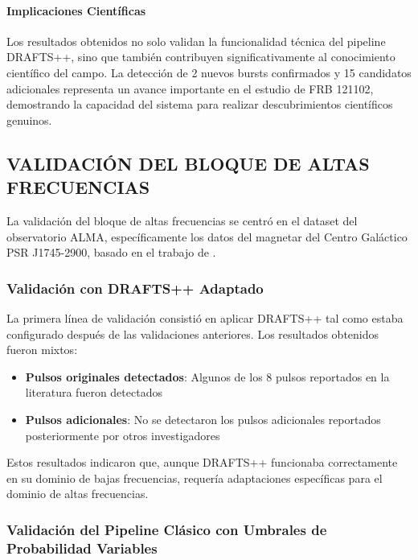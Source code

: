 \paragraph{Implicaciones Científicas}

Los resultados obtenidos no solo validan la funcionalidad técnica del pipeline DRAFTS++, sino que también contribuyen significativamente al conocimiento científico del campo. La detección de 2 nuevos bursts confirmados y 15 candidatos adicionales representa un avance importante en el estudio de FRB 121102, demostrando la capacidad del sistema para realizar descubrimientos científicos genuinos.

\subsection{VALIDACIÓN DEL BLOQUE DE ALTAS FRECUENCIAS}

La validación del bloque de altas frecuencias se centró en el dataset del observatorio ALMA, específicamente los datos del magnetar del Centro Galáctico PSR J1745-2900, basado en el trabajo de \cite{veracasanova2025}.

\subsubsection{Validación con DRAFTS++ Adaptado}

La primera línea de validación consistió en aplicar DRAFTS++ tal como estaba configurado después de las validaciones anteriores. Los resultados obtenidos fueron mixtos:

\begin{itemize}
    \item \textbf{Pulsos originales detectados}: Algunos de los 8 pulsos reportados en la literatura fueron detectados
    \item \textbf{Pulsos adicionales}: No se detectaron los pulsos adicionales reportados posteriormente por otros investigadores
\end{itemize}

Estos resultados indicaron que, aunque DRAFTS++ funcionaba correctamente en su dominio de bajas frecuencias, requería adaptaciones específicas para el dominio de altas frecuencias.

\subsubsection{Validación del Pipeline Clásico con Umbrales de Probabilidad Variables}

